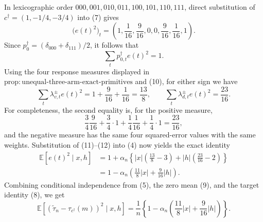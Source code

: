 In lexicographic order \(000,001,010,011,100,101,110,111\), direct substitution of
\(c^\dagger=(1,-1/4,-3/4)\) into (7) gives
\[
\bigl(e(t)^2\bigr)_t
=\left(1,\frac1{16},\frac9{16},0,0,
\frac9{16},\frac1{16},1\right).
\tag{10}
\]
Since \(p_0^\dagger=(\delta_{000}+\delta_{111})/2\), it follows that
\[
\sum_t p_{0,t}^\dagger e(t)^2=1.
\tag{11}
\]
Using the four response measures displayed in
\(\mathrm{prop:unequal\text{-}three\text{-}arm\text{-}exact\text{-}primitives}\) and (10), for either sign we have
\[
\sum_t\lambda_{v,t}^{\pm}e(t)^2
=1+\frac9{16}+\frac1{16}=\frac{13}{8},
\qquad
\sum_t\lambda_{d,t}^{\pm}e(t)^2
=\frac{23}{16}.
\tag{12}
\]
For completeness, the second equality is, for the positive measure,
\[
\frac34\frac9{16}+\frac34\cdot1
+\frac14\frac1{16}+\frac14\cdot1=\frac{23}{16},
\tag{13}
\]
and the negative measure has the same four squared-error values with the same weights.  Substitution of (11)--(12) into (4) now yields the exact identity
\[
\begin{aligned}
\mathbb E[e(t)^2\mid x,h]
&=1+\alpha_n\left\{
|x|\left(\frac{13}{8}-3\right)
+|h|\left(\frac{23}{16}-2\right)\right\}\\
&=1-\alpha_n\left(\frac{11}{8}|x|+\frac9{16}|h|\right).
\end{aligned}
\tag{14}
\]
Combining conditional independence from (5), the zero mean (9), and the target identity (8), we get
\[
\mathbb E\left[
(\widetilde\tau_n-\tau_{c^\dagger}(m))^2\mid x,h\right]
=\frac1n\left\{1-\alpha_n\left(
\frac{11}{8}|x|+\frac9{16}|h|\right)\right\}.
\tag{15}
\]

